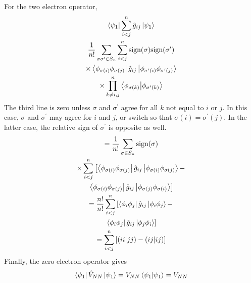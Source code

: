 \documentclass[final,3p,times,twocolumn]{elsarticle}
\begin{document}
\begin{enumerate}
	For the two electron operator,
	\begin{gather}
	\bra{\psi_1}\sum_{i<j}^n\hat g_{ij}\ket{\psi_1} \\
	\begin{gathered}
	\frac{1}{n!}\sum_{\sigma\sigma^\prime\in S_n} \sum_{i < j}^n \text{sign}(\sigma)\text{sign}(\sigma^\prime) \\
	\times \bra{\phi_{\sigma(i)}\phi_{\sigma(j)}}\hat g_{ij} \ket{\phi_{\sigma^\prime(i)}\phi_{\sigma^\prime(j)}} \\
	\times \prod_{k \neq i,j}^n \bra{\phi_{\sigma(k)}}\ket{\phi_{\sigma^\prime(k)}}
	\end{gathered}
	\end{gather}
	The third line is zero unless $\sigma$ and $\sigma^\prime$ agree for all $k$ not equal to $i$ or $j$. In this case, $\sigma$ and $\sigma^\prime$ may agree for $i$ and $j$, or switch so that $\sigma(i) = \sigma^\prime(j)$. In the latter case, the relative sign of $\sigma^\prime$ is opposite as well.
	\begin{gather}
	\begin{gathered}
	= \frac{1}{n!} \sum_{\sigma \in S_n} \text{sign}(\sigma) \\ \times \sum_{i < j}^n \left[ \bra{\phi_{\sigma(i)}\phi_{\sigma(j)}}\hat g_{ij} \ket{\phi_{\sigma(i)}\phi_{\sigma(j)}} - \right.\\ \left. \bra{\phi_{\sigma(i)}\phi_{\sigma(j)}}\hat g_{ij} \ket{\phi_{\sigma(j)}\phi_{\sigma(i)}} \right]
	\end{gathered} \\
	\begin{gathered}
	= \frac{n!}{n!} \sum_{i < j}^n \left[ \bra{\phi_i\phi_j}\hat g_{ij} \ket{\phi_i\phi_j} - \right.\\ \left. \bra{\phi_i\phi_j}\hat g_{ij} \ket{\phi_j\phi_i} \right]
	\end{gathered} \\
	= \sum_{i < j}^n \left[ (ii|jj) - (ij|ij) \right]
	\end{gather}
	Finally, the zero electron operator gives
	\begin{equation}
	\bra{\psi_1}\hat V_{NN} \ket{\psi_1} = V_{NN} \bra{\psi_1}\ket{\psi_1} = V_{NN}
	\end{equation}
	

\end{enumerate}
\end{document}
